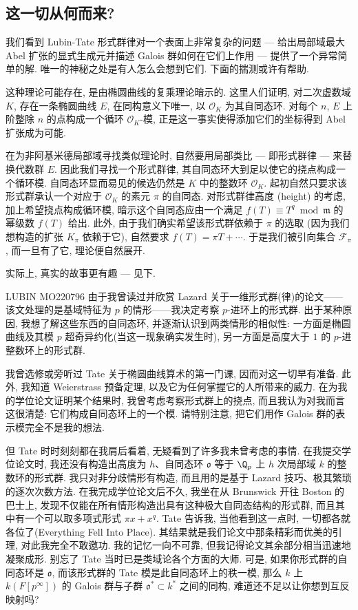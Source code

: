 \subsection*{这一切从何而来?}\label{note:4.20}
我们看到 Lubin-Tate 形式群律对一个表面上非常复杂的问题 — 给出局部域最大 Abel 扩张的显式生成元并描述 Galois 群如何在它们上作用 — 提供了一个异常简单的解. 唯一的神秘之处是有人怎么会想到它们. 下面的揣测或许有帮助.

这种理论可能存在, 是由椭圆曲线的复乘理论暗示的. 这里人们证明, 对二次虚数域 $K$, 存在一条椭圆曲线 $E$, 在同构意义下唯一, 以 $\mathcal{O}_K$ 为其自同态环. 对每个 $n$, $E$ 上阶整除 $n$ 的点构成一个循环 $\mathcal{O}_K$-模, 正是这一事实使得添加它们的坐标得到 Abel 扩张成为可能.

在为非阿基米德局部域寻找类似理论时, 自然要用局部类比 — 即形式群律 — 来替换代数群 $E$. 因此我们寻找一个形式群律, 其自同态环大到足以使它的挠点构成一个循环模. 自同态环显而易见的候选仍然是 $K$ 中的整数环 $\mathcal{O}_K$. 起初自然只要求该形式群承认一个对应于 $\mathcal{O}_K$ 的素元 $\pi$ 的自同态. 对形式群律高度 (height) 的考虑, 加上希望挠点构成循环模, 暗示这个自同态应由一个满足 $f(T)\equiv T^q\bmod\mathfrak{m}$ 的幂级数 $f(T)$ 给出. 此外, 由于我们确实希望该形式群依赖于 $\pi$ 的选取 (因为我们想构造的扩张 $K_{\pi}$ 依赖于它), 自然要求 $f(T)=\pi T+\cdots$. 于是我们被引向集合 $\mathcal{F}_{\pi}$, 而一旦有了它, 理论便自然展开.

实际上, 真实的故事更有趣 — 见下.

\begin{namedblock}{LUBIN MO220796}
由于我曾读过并欣赏 Lazard 关于一维形式群(律)的论文——该文处理的是基域特征为 $p$ 的情形——我决定考察 $p$-进环上的形式群. 出于某种原因, 我想了解这些东西的自同态环, 并逐渐认识到两类情形的相似性: 一方面是椭圆曲线及其模 $p$ 超奇异约化(当这一现象确实发生时), 另一方面是高度大于 $1$ 的 $p$-进整数环上的形式群.

我曾选修或旁听过 Tate 关于椭圆曲线算术的第一门课, 因而对这一切早有准备. 此外, 我知道 Weierstrass 预备定理, 以及它为任何掌握它的人所带来的威力. 在为我的学位论文证明某个结果时, 我曾考虑考察形式群上的挠点, 而且我认为对我而言这很清楚: 它们构成自同态环上的一个模. 请特别注意, 把它们用作 Galois 群的表示模完全不是我的想法.

但 Tate 时时刻刻都在我肩后看着, 无疑看到了许多我未曾考虑的事情. 在我提交学位论文时, 我还没有构造出高度为 $h$、自同态环 $\mathfrak{o}$ 等于 $\Q_p$ 上 $h$ 次局部域 $k$ 的整数环的形式群. 我只对非分歧情形有构造, 而且用的是基于 Lazard 技巧、极其繁琐的逐次次数方法. 在我完成学位论文后不久, 我坐在从 Brunswick 开往 Boston 的巴士上, 发现不仅能在所有情形构造出具有这种极大自同态结构的形式群, 而且其中有一个可以取多项式形式 $\pi x+x^{q}$. Tate 告诉我, 当他看到这一点时, 一切都各就各位了(Everything Fell Into Place). 其结果就是我们论文中那条精彩而优美的引理, 对此我完全不敢邀功. 我的记忆一向不可靠, 但我记得论文其余部分相当迅速地凝聚成形. 别忘了 Tate 当时已是类域论各个方面的大师. 可是, 如果你形式群的自同态环是 $\mathfrak{o}$, 而该形式群的 Tate 模是此自同态环上的秩一模, 那么 $k$ 上 $k(F[p^{\infty}])$ 的 Galois 群与子群 $\mathfrak{o}^{*}\subset k^{*}$ 之间的同构, 难道还不足以让你想到互反映射吗?
\end{namedblock}

